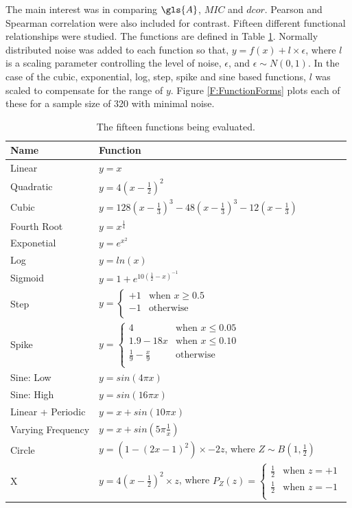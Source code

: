 \documentclass[a4paper, 12pt]{report}
\begin{document}
The main interest was in comparing $\gls{A}$, $MIC$ and $dcor$.  Pearson and Spearman correlation were also included for contrast. Fifteen different functional relationships were studied. The functions are defined in Table \ref{T:functions}. Normally distributed noise was added to each function so that, $y = f(x) + l \times \epsilon$, where $l$ is a scaling parameter controlling the level of noise, $\epsilon$, and $\epsilon \sim N(0, 1)$. In the case of the cubic, exponential, log, step, spike and sine based functions, $l$ was scaled to compensate for the range of $y$. Figure \ref{F:FunctionForms} plots each of these for a sample size of 320 with minimal noise.


\begin{table}[h]
\centering
\begin{tabular}{ll}
  \hline
Name & Function  \\ 
  \hline
Linear &  $y = x$ \\ 
 Quadratic &  $y=4(x-\frac{1}{2})^2$ \\ 
  Cubic &  $y = 128(x-\frac{1}{3})^3 -48(x-\frac{1}{3})^3 -12(x-\frac{1}{3}) $\\ 
  Fourth Root &  $y = x^{\frac{1}{4}}$ \\ 
  Exponetial &  $y = e^{x^2}$ \\ 
  Log &  $y = ln(x)$ \\ 
  Sigmoid &  $y = 1 + e^{10(\frac{1}{2}-x)^{-1}}$ \\ 
  Step &   $
y =
\begin{cases} 
+1 &\text{when } x \ge 0.5\\
-1 &\text{otherwise} \\
\end{cases}$\\ 
  Spike &  $
y =
\begin{cases} 
4 &\text{when } x \le 0.05\\
1.9 -18x &\text{when } x \le 0.10\\
\frac{1}{9} - \frac{x}{9}&\text{otherwise} \\
\end{cases}$ \\ 
  Sine: Low &  $y = sin(4 \pi x)$  \\ 
  Sine: High  &  $y = sin(16 \pi x)$  \\ 
  Linear + Periodic &  $y = x +  sin(10 \pi x)$  \\ 
  Varying Frequency &  $y = x +  sin(5 \pi \frac{1}{x})$  \\ 
  Circle &  $y = (1 - (2x -1)^2) \times -2z$, where $Z \sim B(1,\frac{1}{2})$ \\ 
  X &  $y = 4(x-\frac{1}{2})^2 \times z$, where $P_Z(z)= \begin{cases} 
\frac{1}{2} &\text{when } z = +1\\
\frac{1}{2} &\text{when } z = -1\\
\end{cases}$ \\ 
   \hline
\end{tabular}
\caption{The fifteen functions being evaluated.} 
\label{T:functions}
\end{table}
\end{document}
